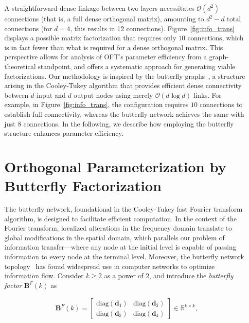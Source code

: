 A straightforward dense linkage between two layers necessitates $\mathcal{O}(d^2)$ connections (that is, a full dense orthogonal matrix), amounting to $d^2-d$ total connections (for $d=4$, this results in 12 connections). Figure~\ref{fig:info_trans} displays a possible matrix factorization that requires only $10$ connections, which is in fact fewer than what is required for a dense orthogonal matrix. This perspective allows for analysis of OFT's parameter efficiency from a graph-theoretical standpoint, and offers a systematic approach for generating viable factorizations. Our methodology is inspired by the butterfly graphs~\cite{cooley1965algorithm}, a structure arising in the Cooley-Tukey algorithm that provides efficient dense connectivity between $d$ input and $d$ output nodes using merely $\mathcal{O}(d\log d)$ links. For example, in Figure~\ref{fig:info_trans}, the configuration requires $10$ connections to establish full connectivity, whereas the butterfly network achieves the same with just $8$ connections. In the following, we describe how employing the butterfly structure enhances parameter efficiency.

\section{Orthogonal Parameterization by Butterfly Factorization}

The butterfly network, foundational in the Cooley-Tukey fast Fourier transform algorithm, is designed to facilitate efficient computation. In the context of the Fourier transform, localized alterations in the frequency domain translate to global modifications in the spatial domain, which parallels our problem of information transfer—where any node at the initial level is capable of passing information to every node at the terminal level. Moreover, the butterfly network topology~\cite{solihin2015fundamentals,li2011linear} has found widespread use in computer networks to optimize information flow. Consider $k\geq 2$ as a power of $2$, and introduce the \emph{butterfly factor} $\bm{B}^F(k)$ as

\begin{equation}\label{eq:but_factor}
\begin{aligned}
    \bm{B}^F(k)=\begin{bmatrix}
    \text{diag}(\bm{d}_1) & \text{diag}(\bm{d}_2) \\
    \text{diag}(\bm{d}_3) & \text{diag}(\bm{d}_4)
    \end{bmatrix}\in\mathbb{R}^{k\times k},
\end{aligned}
\end{equation}

